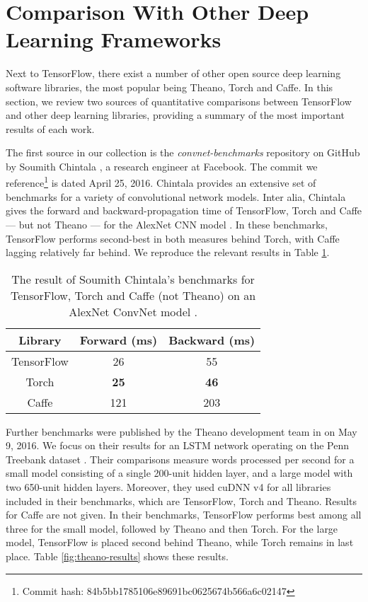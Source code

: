 \section{Comparison With Other Deep Learning Frameworks}\label{sec:comp}

Next to TensorFlow, there exist a number of other open source deep learning
software libraries, the most popular being Theano, Torch and Caffe. In this
section, we review two sources of quantitative comparisons between TensorFlow
and other deep learning libraries, providing a summary of the most important
results of each work.

The first source in our collection is the \emph{convnet-benchmarks} repository
on GitHub by Soumith Chintala \cite{convnet-bench}, a research engineer at
Facebook. The commit we reference\footnote{Commit hash:
  84b5bb1785106e89691bc0625674b566a6c02147} is dated April 25, 2016. Chintala
provides an extensive set of benchmarks for a variety of convolutional network
models. Inter alia, Chintala gives the forward and backward-propagation time of
TensorFlow, Torch and Caffe --- but not Theano --- for the AlexNet CNN model
\cite{alexnet}. In these benchmarks, TensorFlow performs second-best in both
measures behind Torch, with Caffe lagging relatively far behind. We reproduce
the relevant results in Table \ref{tab:convnet}.

\begin{table}
  \centering
  \begin{tabular}{ccc}
    \textbf{Library} & \textbf{Forward (ms)} & \textbf{Backward (ms)}
    \\ \toprule
    TensorFlow & 26  & 55
    \\
    Torch & \textbf{25} & \textbf{46}
    \\
    Caffe & 121 & 203
    \\ \bottomrule
  \end{tabular}
  \caption{The result of Soumith Chintala's benchmarks for TensorFlow, Torch and
    Caffe (not Theano) on an AlexNet ConvNet model \cite{alexnet,
      convnet-bench}.}
  \label{tab:convnet}
\end{table}

Further benchmarks were published by the Theano development team in
\cite{theano} on May 9, 2016. We focus on their results for an LSTM network
operating on the Penn Treebank dataset \cite{penntreebank}. Their comparisons
measure words processed per second for a small model consisting of a single
200-unit hidden layer, and a large model with two 650-unit hidden
layers. Moreover, they used cuDNN v4 for all libraries included in their
benchmarks, which are TensorFlow, Torch and Theano. Results for Caffe are not
given. In their benchmarks, TensorFlow performs best among all three for the
small model, followed by Theano and then Torch. For the large model, TensorFlow
is placed second behind Theano, while Torch remains in last place. Table
\ref{fig:theano-results} shows these results.

